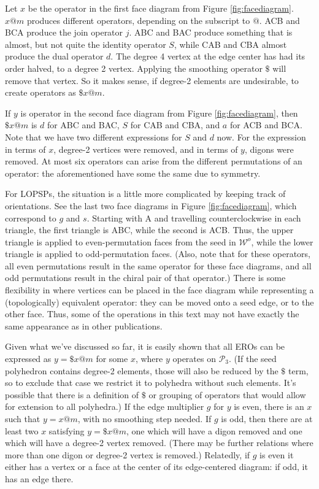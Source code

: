 \documentclass{amsart}[12pt]
\begin{document}
Let $x$ be the operator in the first face diagram from Figure
\ref{fig:facediagram}. $x@m$ produces different operators, depending on the
subscript to $@$. ACB and BCA produce the join operator $j$. ABC and BAC
produce something that is almost, but not quite the identity operator $S$,
while CAB and CBA almost produce the dual operator $d$. The degree 4 vertex at
the edge center has had its order halved, to a degree 2 vertex. Applying the
smoothing operator $\$$ will remove that vertex. So it makes sense, if degree-2
elements are undesirable, to create operators as $\$x@m$.

If $y$ is operator in the second face diagram from Figure \ref{fig:facediagram},
then $\$x@m$ is $d$ for ABC and BAC, $S$ for CAB and CBA, and $a$ for ACB and
BCA. Note that we have two different expressions for $S$ and $d$ now. For the
expression in terms of $x$, degree-2 vertices were removed, and in terms of
$y$, digons were removed.
At most six operators can arise from the different permutations of an operator:
the aforementioned have some the same due to symmetry.

For LOPSPs, the situation is a little more complicated by keeping track of
orientations. See the last two face diagrams in Figure \ref{fig:facediagram},
which correspond to $g$ and $s$. Starting with A and travelling
counterclockwise in each triangle, the first triangle is ABC, while the second
is ACB. Thus, the upper triangle is applied to even-permutation faces from the
seed in $\mathcal{W}^o$, while the lower triangle is applied to odd-permutation
faces. (Also, note that for these operators,
all even permutations result in the same operator for these face diagrams,
and all odd permutations result in the chiral pair of that operator.) There is
some flexibility in where vertices can be placed in the face diagram while
representing a (topologically) equivalent operator: they can be moved onto a
seed edge, or to the other face. Thus, some of the operations in this text may
not have exactly the same appearance as in other publications.

Given what we've discussed so far, it is easily shown that all EROs can be
expressed as $y = \$x@m$ for some $x$, where $y$ operates on $\mathcal{P}_3$.
(If the seed polyhedron contains degree-2 elements, those will also be reduced
by the $\$$ term, so to exclude that case we restrict it to polyhedra without
such elements. It's possible that there is a definition of $\$$ or grouping
of operators that would allow for extension to all polyhedra.) If the edge
multiplier $g$ for $y$ is even, there is an $x$ such that $y = x@m$, with no
smoothing step needed. If $g$ is odd, then there are at least two $x$
satisfying $y = \$x@m$, one which will have a digon removed and one which will
have a degree-2 vertex removed. (There may be further relations where more than
one digon or degree-2 vertex is removed.) Relatedly, if $g$ is even it either
has a vertex or a face at the center of its edge-centered diagram:
if odd, it has an edge there.
\end{document}
